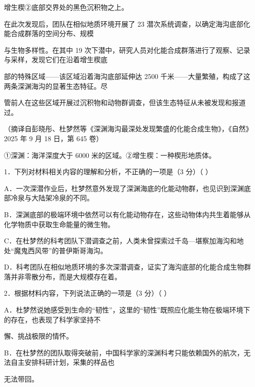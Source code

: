 \documentclass[UTF8,a4paper,fontset=fandol]{ctexart}
\begin{document}
增生楔②底部交界处的黑色沉积物之上。\par
\hspace*{1.8em}在此次发现后，团队在相似地质环境开展了 23 潜次系统调查，以确定海沟底部化能合成群落的空间分布、规模\par
与生物多样性。在其中 19 次下潜中，研究人员对化能合成群落进行了观察、记录与采样，发现它们在沿着增生楔底\par
部的特殊区域——该区域沿着海沟底部延伸达 2500 千米——大量繁殖，构成了这两条深渊海沟的显著生态特征。尽\par
管前人在这些区域开展过沉积物和动物群调查，但该生态特征从未被发现和报道过。\par
\hspace*{1.8em}（摘译自彭晓彤、杜梦然等《深渊海沟最深处发现繁盛的化能合成生物》，《自然》2025 年 9 月 18 日，第 645 卷）\par
\vspace{0.35em}\par
[注] ①深渊：海洋深度大于 6000 米的区域。②增生楔：一种楔形地质体。\par
\vspace{0.35em}\par
1．下列对材料相关内容的理解和分析，不正确的一项是（3 分）（ ）\par
A．一次深潜作业后，杜梦然意外发现了深渊海底的化能动物群，也见识到深渊底部冷泉与大陆架冷泉的不同。\par
B．深渊底部的极端环境中依然可以有化能动物存在，这些动物体内共生着能够从化学物质中获取生命能量的微生物。\par
C．在杜梦然的科考团队下潜调查之前，人类未曾探索过千岛—堪察加海沟和地处“魔鬼西风带”的普伊斯哥海沟。\par
D．科考团队在相似地质环境的多次深潜调查，证实了海沟底部的化能合成生物群落并非零散分布，而是大规模存在着。\par
\vspace{0.35em}\par
2．根据材料内容，下列说法正确的一项是（3 分）（ ）\par
A．杜梦然说她感受到生命的“韧性”，这里的“韧性”既照应化能生物在极端环境下的存在，也表现了科学家坚持不\par
\hspace*{1.8em}懈、挑战极限的情怀。\par
B．在杜梦然的团队取得突破前，中国科学家的深渊科考只能依赖国外的航次，无法自主安排科研计划，采集的样品也\par
\hspace*{1.8em}无法带回。\par
\end{document}
